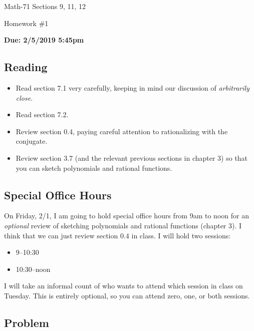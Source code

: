 \documentclass[letterpaper,12pt,fleqn]{article}
\begin{document}
\begin{center}
  \large
  Math-71 Sections 9, 11, 12

  \Large
  Homework \#1

  \large
  \textbf{Due: 2/5/2019 5:45pm}
\end{center}

\subsection*{Reading}

\begin{itemize}
\item Read section 7.1 very carefully, keeping in mind our discussion of \emph{arbitrarily close}.
\item Read section 7.2.
\item Review section 0.4, paying careful attention to rationalizing with the conjugate.
\item Review section 3.7 (and the relevant previous sections in chapter 3) so that you can sketch polynomials and
  rational functions.
\end{itemize}

\subsection*{Special Office Hours}
On Friday, 2/1, I am going to hold special office hours from 9am to noon for an \emph{optional} review of sketching
polynomials and rational functions (chapter 3).  I think that we can just review section 0.4 in class.  I will hold two
sessions:
\begin{itemize}
\item 9--10:30
\item 10:30--noon
\end{itemize}
I will take an informal count of who wants to attend which session in class on Tuesday.  This is entirely optional, so you
can attend zero, one, or both sessions.

\subsection*{Problem}
\end{document}
